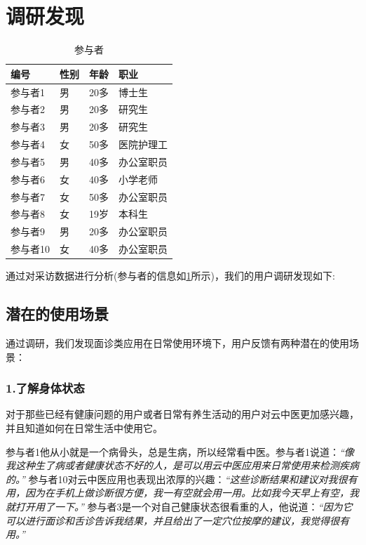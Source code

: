 \section{调研发现}
\begin{table}
  
  \centering
  \label{tab:Participants}
  \begin{tabular}{llll}
        \toprule
        编号 &	性别 &	年龄 &	职业 \\
        \midrule
        参与者1 &	男 &	20多 &	博士生 \\
        参与者2 &	男 &	20多 &	研究生 \\
        参与者3 &	男 &	20多 &	研究生 \\
        参与者4 &	女 &	50多 &	医院护理工 \\
        参与者5 &	男 &	40多 &	办公室职员 \\
        参与者6 &	女 &	40多 &	小学老师 \\
        参与者7 &	女 &	50多 &	办公室职员 \\
        参与者8 &	女 &	19岁 &	本科生 \\
        参与者9 &	男 &	20多 &	办公室职员 \\
        参与者10 &	女 &	40多 &	办公室职员 \\
        \bottomrule
  \end{tabular}
  \caption{参与者}
\end{table}
通过对采访数据进行分析(参与者的信息如\ref{tab:Participants}所示)，我们的用户调研发现如下:
\subsection{潜在的使用场景}
通过调研，我们发现面诊类应用在日常使用环境下，用户反馈有两种潜在的使用场景：

\subsubsection{1.了解身体状态}

对于那些已经有健康问题的用户或者日常有养生活动的用户对云中医更加感兴趣，并且知道如何在日常生活中使用它。

参与者1他从小就是一个病骨头，总是生病，所以经常看中医。参与者1说道：\emph{“像我这种生了病或者健康状态不好的人，是可以用云中医应用来日常使用来检测疾病的。”}
参与者10对云中医应用也表现出浓厚的兴趣：\textit{“这些诊断结果和建议对我很有用，因为在手机上做诊断很方便，我一有空就会用一用。比如我今天早上有空，我就打开用了一下。”}
参与者3是一个对自己健康状态很看重的人，他说道：\textit{“因为它可以进行面诊和舌诊告诉我结果，并且给出了一定穴位按摩的建议，我觉得很有用。”}

